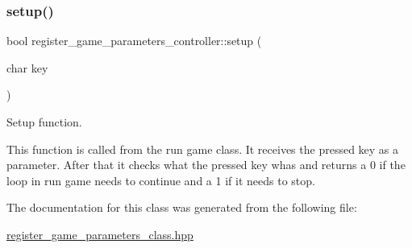 \subsubsection{\texorpdfstring{setup()}{setup()}}
{\footnotesize\ttfamily bool register\+\_\+game\+\_\+parameters\+\_\+controller\+::setup (\begin{DoxyParamCaption}\item[{char}]{key }\end{DoxyParamCaption})\hspace{0.3cm}{\ttfamily [inline]}}



Setup function. 

This function is called from the run game class. It receives the pressed key as a parameter. After that it checks what the pressed key whas and returns a 0 if the loop in run game needs to continue and a 1 if it needs to stop. 

The documentation for this class was generated from the following file\+:\begin{DoxyCompactItemize}
\item 
\hyperlink{register__game__parameters__class_8hpp}{register\+\_\+game\+\_\+parameters\+\_\+class.\+hpp}\end{DoxyCompactItemize}
